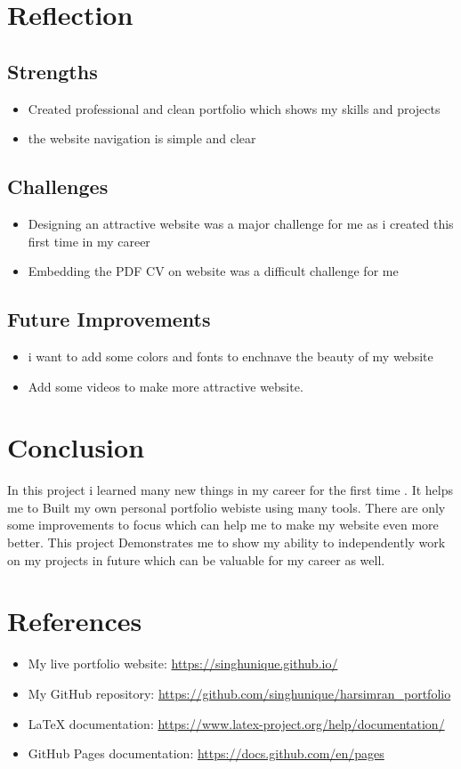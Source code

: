 \documentclass{article}
\begin{document}
\section{Reflection}

\subsection{Strengths}
\begin{itemize}
    \item Created professional and clean portfolio which shows my skills and projects  
    \item the website navigation is simple and clear 
\end{itemize}

\subsection{Challenges} 
\begin{itemize}
    \item Designing an attractive website was a major challenge for me as i created this first time in my career
    \item Embedding the PDF CV on website was a difficult challenge for  me
\end{itemize}

\subsection{Future Improvements}
\begin{itemize}
    \item i want to add some colors and fonts to enchnave the beauty of my website
    \item Add some videos  to make more attractive website.
\end{itemize}    

\section{Conclusion}
In this project i learned many new things in my career for the first time . It helps me to Built my own personal portfolio webiste using many tools. There are only some improvements to focus which can help me to make my website even more better. This project Demonstrates me to show my ability to independently work on my projects in future which can be valuable for my career as well. 

\section{References}

\begin{itemize}
    \item My live portfolio website: \url{https://singhunique.github.io/}
    \item My GitHub repository: \url{https://github.com/singhunique/harsimran_portfolio}
    \item LaTeX documentation: \url{https://www.latex-project.org/help/documentation/}
    \item GitHub Pages documentation: \url{https://docs.github.com/en/pages}
\end{itemize}
\end{document}
